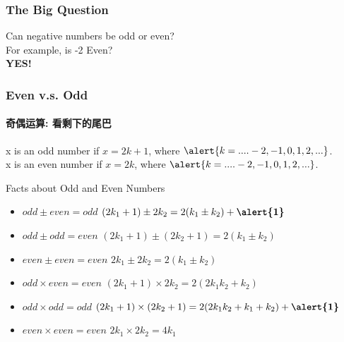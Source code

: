 \documentclass[
	11pt, %
]{beamer}
\begin{document}

\begin{frame}
	\frametitle{The Big Question}

	{\LARGE Can negative numbers be odd or even? \\ For example, is -2 Even?\\ }
	\pause
	\bigskip
	{\LARGE \textbf{\alert{YES!}}}
\end{frame}


\begin{frame}
	\frametitle{Even v.s. Odd}
	\framesubtitle{奇偶运算: 看剩下的尾巴}
		\begin{definition}
		  x is an odd number  if $x = 2k + 1$, where $\alert{k = .... -2, -1, 0, 1, 2, ...}$.\\
		  x is an even number  if $x = 2k$, where $\alert{k = .... -2, -1, 0, 1, 2, ...}$.
	 \end{definition}
	
	\smallskip %

	\begin{block}{Facts about Odd and Even Numbers}
			\begin{itemize}
			\item $odd \pm even = odd$  \quad $(2k_1 + 1) \pm 2k_2 = 2(k_1 \pm k_2) + \textbf{\alert{1}}$
			\item $odd \pm odd = even$ \quad $(2k_1 + 1) \pm (2k_2 + 1) = 2(k_1 \pm k_2) $
			\item $even \pm even = even$ \quad $2k_1  \pm 2k_2  = 2(k_1 \pm k_2) $
		\end{itemize}
		\bigskip
		\begin{itemize}
			\item $odd \times even = even$ \quad $(2k_1 + 1) \times 2k_2  = 2(2k_1  k_2 + k_2)$
			\item $odd \times odd = odd$ \quad $(2k_1 + 1) \times (2k_2 + 1) = 2(2k_1  k_2 + k_1 + k_2) + \textbf{\alert{1}}$
			\item $even \times even = even$ \quad $2k_1 \times 2k_2  = 4k_1$
		\end{itemize}
	\end{block}
\end{frame}

\end{document}
